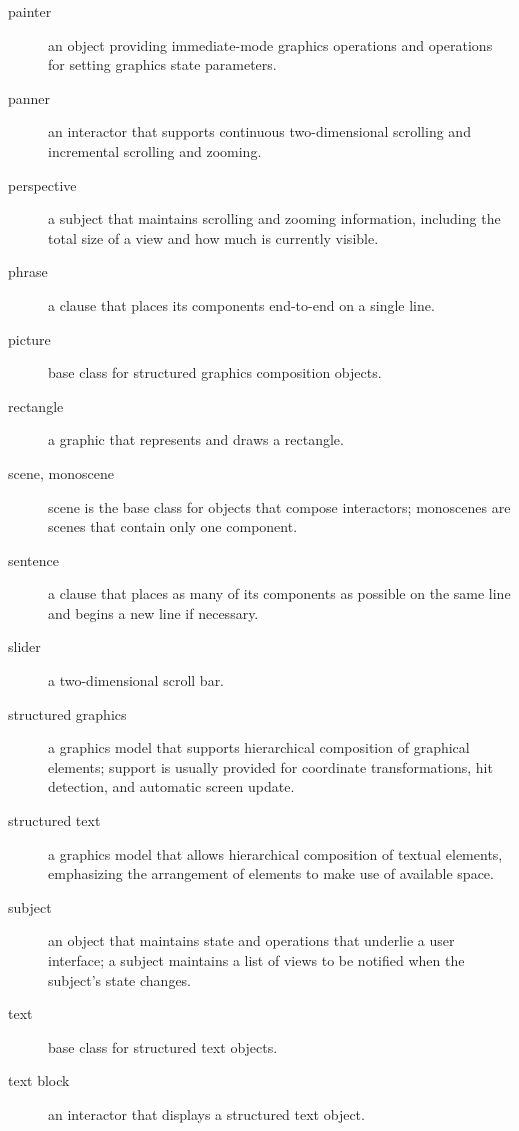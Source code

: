 \begin{description}
\item [painter] an object providing immediate-mode graphics operations
and operations for
setting graphics state parameters.

\item [panner] an interactor that supports continuous two-dimensional 
scrolling and incremental scrolling and zooming.

\item [perspective] a subject that maintains scrolling and zooming
information, including the total size of a view and how much is
currently visible.

\item [phrase] a clause that places its components end-to-end on a
single line.

\item [picture] base class for structured graphics composition objects.

\item [rectangle] a graphic that represents and draws a rectangle.

\item [scene, monoscene] scene is the base class for objects that
compose interactors; monoscenes are scenes that contain only one
component.

\item [sentence] a clause that places as many of its components
as possible on the same line and begins a new line if necessary.

\item [slider] a two-dimensional scroll bar.

\item [structured graphics] a graphics model that supports
hierarchical composition of graphical elements;
support is usually provided for
coordinate transformations, hit detection, and
automatic screen update.

\item [structured text] a graphics model that allows hierarchical
composition of textual elements,
emphasizing the arrangement of elements to make use of available space.

\item [subject] an object that maintains state and operations that
underlie a user interface; a subject maintains a list of views to be
notified when the subject's state changes.

\item [text] base class for structured text objects.

\item [text block] an interactor that displays a structured text object.


\end{description}
